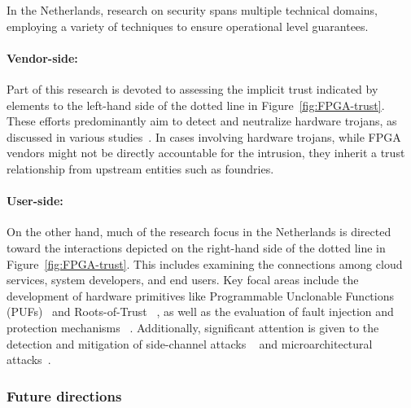 In the Netherlands, research on security spans multiple technical domains, employing a variety of techniques to ensure operational level guarantees.

\paragraph{Vendor-side:} Part of this research is devoted to assessing the implicit trust indicated by elements to the left-hand side of the dotted line in Figure~\ref{fig:FPGA-trust}. These efforts predominantly aim to detect and neutralize hardware trojans, as discussed in various studies~\cite{Zeitouni2021TrustedFPGAs,Labafniya2020OnPrevention,Nikiema2023TowardsDevices,Palumbo2022IsAnswer}. In cases involving hardware trojans, while FPGA vendors might not be directly accountable for the intrusion, they inherit a trust relationship from upstream entities such as foundries.

\paragraph{User-side:}
On the other hand, much of the research focus in the Netherlands is directed toward the interactions depicted on the right-hand side of the dotted line in Figure~\ref{fig:FPGA-trust}. This includes examining the connections among cloud services, system developers, and end users. Key focal areas include the development of hardware primitives like Programmable Unclonable Functions (PUFs)~\cite{Jin2022ProgrammableApplications,Jin2020ErasableDesign} and Roots-of-Trust ~\cite{Nikiema2023TowardsDevices}, as well as the evaluation of fault injection and protection mechanisms ~\cite{Miteloudi2022ROCKY:Data,Nikiema2023TowardsDevices,Koylu2022InstructionAttacks,Koylu2022ExploitingAttacks}. Additionally, significant attention is given to the detection and mitigation of side-channel attacks ~\cite{Lahr2020SideImplementation,Miteloudi2021EvaluatingLeakage, Socha2020Side-channelHardware, Garaffa2021RevealingNeuron} and microarchitectural attacks~\cite{Arikan2022ProcessorSketches,Nikiema2023TowardsDevices}.

\subsubsection*{\bf{Future directions}}

